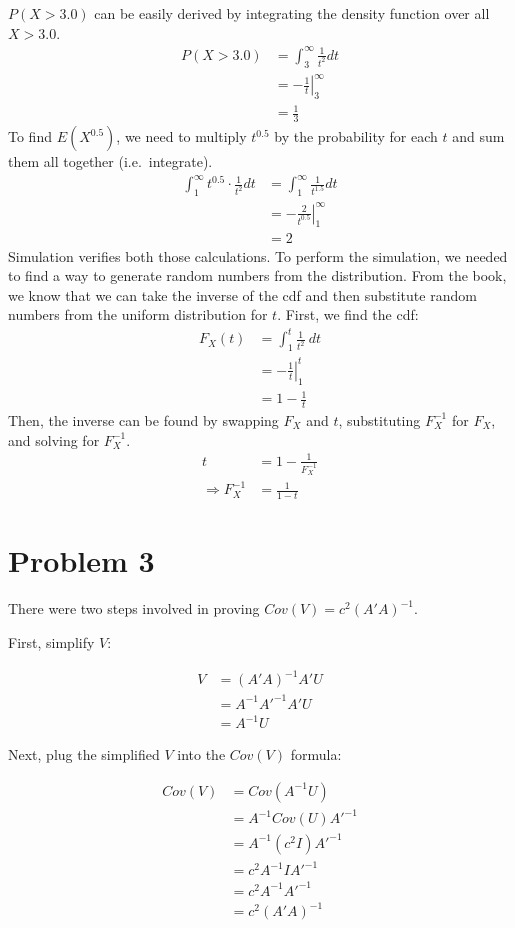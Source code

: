 \documentclass{article}
\begin{document}
$P( X > 3.0 )$ can be easily derived by integrating the density function over
all $X > 3.0$.
\begin{align*}
  P( X > 3.0 ) &= \int_{3}^{\infty} \frac{1}{t^2} dt \\
               &= \left.-\frac{1}{t} \right|_3^\infty \\
               &= \frac{1}{3}
\end{align*}
To find $E(X^{0.5})$, we need to multiply $t^{0.5}$ by the probability for each
$t$ and sum them all together (i.e.\ integrate).
\begin{align*}
  \int_1^\infty t^{0.5}\cdot\frac{1}{t^2} dt &= \int_1^\infty \frac{1}{t^{1.5}}
  dt \\
  &=\left. - \frac{2}{t^{0.5}} \right|_1^\infty \\
  &= 2
\end{align*}
Simulation verifies both those calculations. To perform the simulation, we needed to
find a way to generate random numbers from the distribution. From the book, we
know that we can take the inverse of the cdf and then substitute random
numbers from the uniform distribution for $t$. First, we find the cdf:
\begin{align*}
  F_X(t) &= \int_1^t \frac{1}{t^2} \ dt \\
         &= \left. - \frac{1}{t} \right|_1^t \\
         &= 1 - \frac{1}{t}
\end{align*}
Then, the inverse can be found by swapping $F_X$ and $t$, substituting
$F_X^{-1}$ for $F_X$, and solving for $F_X^{-1}$.
\begin{align*}
  t &= 1 - \frac{1}{F_X^{-1}} \\
  \Rightarrow F_X^{-1} &= \frac{1}{1 - t}
\end{align*}

\section*{Problem 3}

There were two steps involved in proving $Cov(V) = c^{2}(A'A)^{-1}$.

First, simplify $V$:

\begin{align*}
  V &= (A'A)^{-1}A'U \\
    &= A^{-1}A'^{-1}A'U \\
    &= A^{-1}U
\end{align*}

Next, plug the simplified $V$ into the $Cov(V)$ formula:

\begin{align*}
  Cov(V) &= Cov(A^{-1}U) \\
         &= A^{-1}Cov(U)A'^{-1} \\
         &= A^{-1}(c^{2}I)A'^{-1} \\
         &= c^{2}A^{-1}IA'^{-1} \\
         &= c^{2}A^{-1}A'^{-1} \\
         &= c^{2}(A'A)^{-1}
\end{align*}
\end{document}
